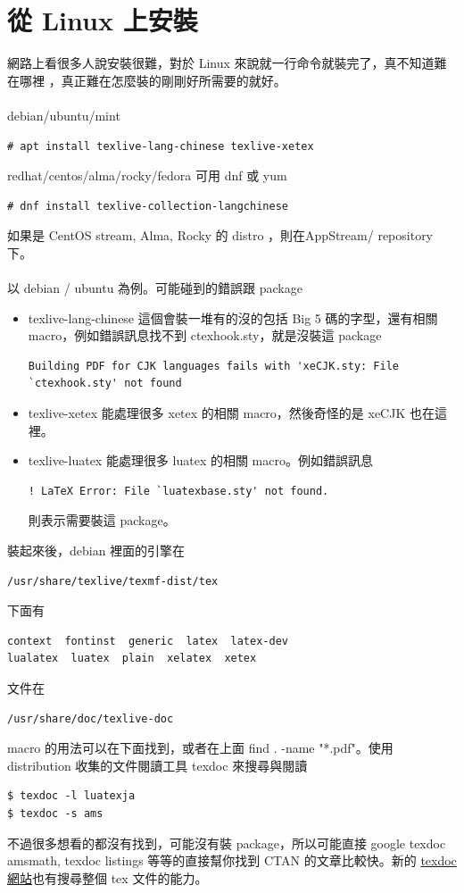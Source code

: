 \section{從 Linux 上安裝}
網路上看很多人說安裝很難，對於 Linux 來說就一行命令就裝完了，真不知道難在哪裡
，真正難在怎麼裝的剛剛好所需要的就好。
\\\\
debian/ubuntu/mint
\begin{verbatim}
# apt install texlive-lang-chinese texlive-xetex
\end{verbatim}
redhat/centos/alma/rocky/fedora 可用 dnf 或 yum
\begin{verbatim}
# dnf install texlive-collection-langchinese
\end{verbatim}
如果是 CentOS stream, Alma, Rocky 的 distro ，則在AppStream/ repository 下。
\\\\
以 debian / ubuntu 為例。可能碰到的錯誤跟 package
\begin{itemize}
\item texlive-lang-chinese 這個會裝一堆有的沒的包括 Big 5 碼的字型，還有相關
 macro，例如錯誤訊息找不到 ctexhook.sty，就是沒裝這 package

\begin{verbatim}
Building PDF for CJK languages fails with 'xeCJK.sty: File `ctexhook.sty' not found
\end{verbatim}

\item texlive-xetex 能處理很多 xetex 的相關 macro，然後奇怪的是 xeCJK 也在這裡。
\item texlive-luatex 能處理很多 luatex 的相關 macro。例如錯誤訊息

\begin{verbatim}
! LaTeX Error: File `luatexbase.sty' not found.
\end{verbatim}

則表示需要裝這 package。

\end{itemize}
裝起來後，debian 裡面的引擎在
\begin{verbatim}
/usr/share/texlive/texmf-dist/tex
\end{verbatim}
下面有
\begin{verbatim}
context  fontinst  generic  latex  latex-dev  
lualatex  luatex  plain  xelatex  xetex
\end{verbatim}
文件在
\begin{verbatim}
/usr/share/doc/texlive-doc
\end{verbatim}
macro 的用法可以在下面找到，或者在上面 find . -name "*.pdf"。使用 distribution
收集的文件閱讀工具 texdoc 來搜尋與閱讀
\begin{verbatim}
$ texdoc -l luatexja
$ texdoc -s ams
\end{verbatim}
不過很多想看的都沒有找到，可能沒有裝 package，所以可能直接 google texdoc
amsmath, texdoc listings 等等的直接幫你找到 CTAN 的文章比較快。新的 
\href{https://texdoc.org}{texdoc 網站}也有搜尋整個 tex 文件的能力。

